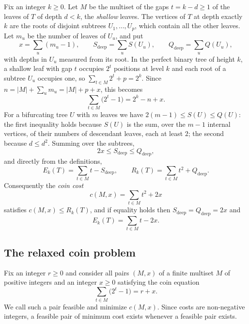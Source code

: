 \documentclass[11pt]{amsart}
\theoremstyle{remark}
\begin{document}
Fix an integer $k\ge0$.
Let $M$ be the multiset of the gaps $t=k-d\ge1$ of the leaves of $T$ of depth $d<k$, the \emph{shallow} leaves.
The vertices of $T$ at depth exactly $k$ are the roots of disjoint subtrees $U_1,\dots,U_p$, which contain all the other leaves.
Let $m_u$ be the number of leaves of $U_u$, and put
\[
x=\sum_u(m_u-1),\qquad S_{\mathrm{deep}}=\sum_u S(U_u),\qquad Q_{\mathrm{deep}}=\sum_u Q(U_u),
\]
with depths in $U_u$ measured from its root.
In the perfect binary tree of height $k$, a shallow leaf with gap $t$ occupies $2^t$ positions at level $k$ and each root of a subtree $U_u$ occupies one, so $\sum_{t\in M}2^t+p=2^k$.
Since $n=|M|+\sum_u m_u=|M|+p+x$, this becomes
\begin{equation}\label{eq:count}
\sum_{t\in M}\bigl(2^t-1\bigr)=2^k-n+x .
\end{equation}
For a bifurcating tree $U$ with $m$ leaves we have $2(m-1)\le S(U)\le Q(U)$: the first inequality holds because $S(U)$ is the sum, over the $m-1$ internal vertices, of their numbers of descendant leaves, each at least $2$; the second because $d\le d^2$.
Summing over the subtrees,
\begin{equation}\label{eq:x}
2x\le S_{\mathrm{deep}}\le Q_{\mathrm{deep}},
\end{equation}
and directly from the definitions,
\begin{equation}\label{eq:moments}
E_k(T)=\sum_{t\in M}t-S_{\mathrm{deep}},\qquad R_k(T)=\sum_{t\in M}t^2+Q_{\mathrm{deep}} .
\end{equation}
Consequently the \emph{coin cost}
\[
c(M,x)=\sum_{t\in M}t^2+2x
\]
satisfies $c(M,x)\le R_k(T)$, and if equality holds then $S_{\mathrm{deep}}=Q_{\mathrm{deep}}=2x$ and
\begin{equation}\label{eq:Eeq}
E_k(T)=\sum_{t\in M}t-2x .
\end{equation}

\subsection{The relaxed coin problem}

Fix an integer $r\ge0$ and consider all pairs $(M,x)$ of a finite multiset $M$ of positive integers and an integer $x\ge0$ satisfying the coin equation
\begin{equation}\label{eq:coin}
\sum_{t\in M}\bigl(2^t-1\bigr)=r+x .
\end{equation}
We call such a pair feasible and minimize $c(M,x)$.
Since costs are non-negative integers, a feasible pair of minimum cost exists whenever a feasible pair exists.
\end{document}
